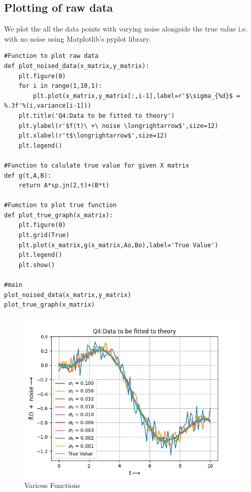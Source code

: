 \documentclass[11pt, a4paper]{article}
\begin{document}
\subsection{Plotting of raw data}
\par We plot the all the data points with varying noise alongside the true value i.e. with no noise using Matplotlib's pyplot library.
\begin{lstlisting}
#Function to plot raw data
def plot_noised_data(x_matrix,y_matrix):
	plt.figure(0)
	for i in range(1,10,1):
		plt.plot(x_matrix,y_matrix[:,i-1],label=r'$\sigma_{%d}$ = %.3f'%(i,variance[i-1]))
	plt.title('Q4:Data to be fitted to theory')
	plt.ylabel(r'$f(t)\ +\ noise \longrightarrow$',size=12)
	plt.xlabel(r't$\longrightarrow$',size=12)
	plt.legend()

#Function to calulate true value for given X matrix
def g(t,A,B):
	return A*sp.jn(2,t)+(B*t)

#Fumction to plot true function
def plot_true_graph(x_matrix):
	plt.figure(0)
	plt.grid(True)
	plt.plot(x_matrix,g(x_matrix,Ao,Bo),label='True Value')
	plt.legend()
	plt.show()

#main
plot_noised_data(x_matrix,y_matrix)
plot_true_graph(x_matrix)
\end{lstlisting}
\begin{figure}[!tbh]
   	\centering
   	\includegraphics[scale=0.7]{Q3.png}  %
   	\caption{Various Functions}
   	\label{fig:Data plot}
   \end{figure} 
\end{document}
